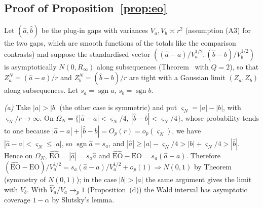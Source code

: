 \subsection{Proof of Proposition~\ref{prop:eo}}\label{si:testing-eo}

Let $(\hat a,\hat b)$ be the plug-in gaps with variances $V_a,V_b\asymp r^2$ (assumption (A3) for the two gaps, which are smooth functions of the totals like the comparison contrasts) and suppose the standardised vector $((\hat a-a)/V_a^{1/2},(\hat b-b)/V_b^{1/2})$ is asymptotically $N(0,R_\infty)$ along subsequences (Theorem~ with $Q=2$), so that $Z^N_a=(\hat a-a)/r$ and $Z_b^N=(\hat b-b)/r$ are tight with a Gaussian limit $(Z_a,Z_b)$ along subsequences. Let $s_a=\operatorname{sgn}a$, $s_b=\operatorname{sgn}b$.

\emph{(a)} Take $|a|>|b|$ (the other case is symmetric) and put $\varsigma_N=|a|-|b|$, with $\varsigma_N/r\to\infty$. On $\Omega_N=\{|\hat a-a|<\varsigma_N/4,\ |\hat b-b|<\varsigma_N/4\}$, whose probability tends to one because $|\hat a-a|+|\hat b-b|=O_p(r)=o_p(\varsigma_N)$, we have $|\hat a-a|<\varsigma_N\le|a|$, so $\operatorname{sgn}\hat a=s_a$, and $|\hat a|\ge|a|-\varsigma_N/4>|b|+\varsigma_N/4>|\hat b|$. Hence on $\Omega_N$, $\widehat{\mathrm{EO}}=|\hat a|=s_a\hat a$ and $\widehat{\mathrm{EO}}-\mathrm{EO}=s_a(\hat a-a)$. Therefore $(\widehat{\mathrm{EO}}-\mathrm{EO})/V_a^{1/2}=s_a(\hat a-a)/V_a^{1/2}+o_p(1)\Rightarrow N(0,1)$ by Theorem~ (symmetry of $N(0,1)$); in the case $|b|>|a|$ the same argument gives the limit with $V_b$. With $\hat V_a/V_a\to_p1$ (Proposition~(d)) the Wald interval has asymptotic coverage $1-\alpha$ by Slutsky's lemma.

